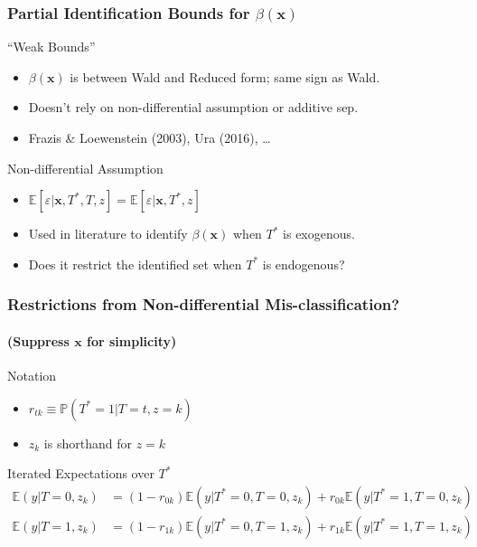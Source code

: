 \documentclass[handout]{beamer}
\begin{document}
\begin{frame}
  \frametitle{Partial Identification Bounds for $\beta(\mathbf{x})$}

  \begin{block}{``Weak Bounds''}
    \begin{itemize}
      \item $\beta(\mathbf{x})$ is between Wald and Reduced form; same sign as Wald.
      \item Doesn't rely on non-differential assumption or additive sep.\
      \item Frazis \& Loewenstein (2003), Ura (2016), \ldots
    \end{itemize}
    \end{block}

    \begin{alertblock}{Non-differential Assumption}
      \begin{itemize}
        \item $\mathbb{E}[\varepsilon|\mathbf{x},T^*,T,z] = \mathbb{E}[\varepsilon|\mathbf{x},T^*,z]$
        \item Used in literature to identify $\beta(\mathbf{x})$ when $T^*$ is exogenous. 
        \item Does it restrict the identified set when $T^*$ is \alert{endogenous}? 
      \end{itemize}
    \end{alertblock}


\end{frame}
\begin{frame}[t]
  \frametitle{Restrictions from Non-differential Mis-classification?}
  \framesubtitle{(Suppress $\mathbf{x}$ for simplicity)}

  \footnotesize

  \begin{block}{Notation}
    \begin{itemize}
      \item $r_{tk} \equiv \mathbb{P}(T^*=1|T=t,z=k)$
      \item $z_k$ is shorthand for $z =k$\\
    \end{itemize}
  \end{block}

  \begin{block}{Iterated Expectations over $T^*$}
    \vspace{-1em}
  \begin{align*}
    \mathbb{E}(y|T=0,z_k) &= (1 - r_{0k})\mathbb{E}(y|T^*=0,T=0,z_k) + r_{0k}\mathbb{E}(y|T^*=1,T=0,z_k)\\
    \mathbb{E}(y|T=1,z_k) &= (1 - r_{1k}) \mathbb{E}(y|T^*=0,T=1,z_k) + r_{1k}\mathbb{E}(y|T^*=1,T=1,z_k)
  \end{align*}
  \end{block}

\end{frame}
\end{document}
